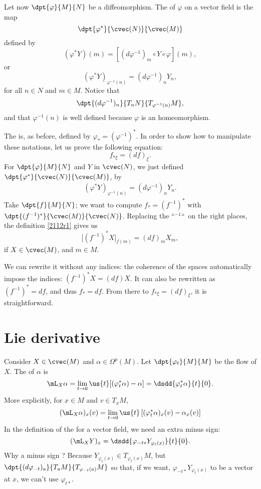 Let now $\dpt{\varphi}{M}{N}$ be a diffeomorphism. The  of $\varphi$ on a vector field is the map
\[
	\dpt{\varphi^*}{\cvec(N)}{\cvec(M)}
\]
defined by
\[
	(\varphi^*Y)(m)=[(d\varphi^{-1})_m\circ Y\circ\varphi](m),
\]
or
\[
	(\varphi^*Y)_{\varphi^{-1}(n)}=(d\varphi^{-1})_nY_n,
\]
for all $n\in N$ and $m\in M$. Notice that \[\dpt{(d\varphi^{-1})_n}{T_nN}{T_{\varphi^{-1}(n)}M},\] and that  $\varphi^{-1}(n)$ is well defined because $\varphi$ is an homeomorphism.

The  is, as before, defined by $\varphi_*=(\varphi^{-1})^*$. In order to show how to manipulate these notations, let us prove the following equation:
\[
	f_{*\xi}=(df)_{\xi}.
\]
For $\dpt{\varphi}{M}{N}$ and $Y$ in $\cvec(N)$, we just defined $\dpt{\varphi^*}{\cvec(N)}{\cvec(M)}$, by
\begin{eqnarray}
	\label{2112r1}(\varphi^*Y)_{\varphi^{-1}(n)}=(d\varphi^{-1})_nY_n.
\end{eqnarray}
Take $\dpt{f}{M}{N}$; we want to compute $f_*=(f^{-1})^*$ with $\dpt{(f^{-1})^*}{\cvec(M)}{\cvec(N)}$. Replacing the ``$^{-1}$``\ on the right places, the definition \eqref{2112r1} gives us
\[
	\Big[(f^{-1})^*X\Big]_{f(m)}=(df)_mX_m,
\]
if $X\in\cvec(M)$, and $m\in M$.

We can rewrite it without  any indices: the coherence of the spaces automatically impose the indices: $(f^{-1})^*X=(df)X$. It can also be rewritten as $(f^{-1})^*=df$, and thus $f_*=df$. From there to $f_{* \xi}=(df)_{\xi}$, it is straightforward.


\section{Lie derivative}

Consider $X\in\cvec(M)$ and $\alpha\in\Omega^p(M)$. Let $\dpt{\varphi_t}{M}{M}$ be the flow of $X$. The  of $\alpha$ is
\begin{equation}\label{liesurforme}
	\mL_X\alpha=\lim_{t\to 0}\us{t}[(\varphi^*_t\alpha)-\alpha]=\dsdd{\varphi^*_t\alpha}{t}{0}.
\end{equation}
More explicitly, for $x\in M$ and $v\in T_xM$,
\[
	(\mL_X\alpha)_x(v)=\lim_{t\to 0}\us{t}\left[(\varphi_t^*\alpha)_x(v)-\alpha_x(v)\right]
\]
In the definition of the  for a vector field, we need an extra minus sign:
\begin{equation}		\label{EqDefLieDerivativeVect}
	(\mL_XY)_x=\dsdd{\varphi_{-t*}Y_{\varphi_t(x)}}{t}{0}.
\end{equation}
Why a minus sign ? Because $Y_{\varphi_t(x)}\in T_{\varphi_t(x)}M$, but $\dpt{(d\varphi_{-t})_a}{T_aM}{T_{\varphi_{-t}(a)}M}$ so that, if we want, $\varphi_{-t*}Y_{\varphi_t(x)}$ to be a vector at $x$, we can't use $\varphi_{t*}$.

